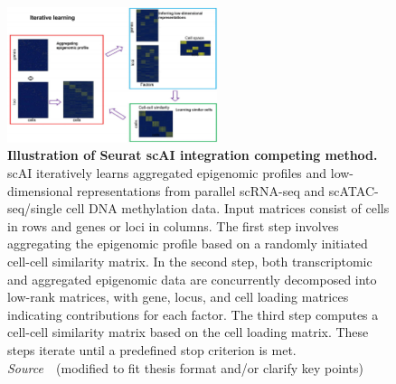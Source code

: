 \begin{description}


\begin{figure}[!h]
  	\centering
  	\includegraphics[width=0.55\textwidth]{Alg_scAI/fig}
  	\vspace{0.1cm}
  	\caption[Illustration of Seurat scAI integration competing method.]{\textbf{Illustration of Seurat scAI integration competing method.} scAI iteratively learns aggregated epigenomic profiles and low-dimensional representations from parallel scRNA-seq and scATAC-seq/single cell DNA methylation data. Input matrices consist of cells in rows and genes or loci in columns. The first step involves aggregating the epigenomic profile based on a randomly initiated cell-cell similarity matrix. In the second step, both transcriptomic and aggregated epigenomic data are concurrently decomposed into low-rank matrices, with gene, locus, and cell loading matrices indicating contributions for each factor. The third step computes a cell-cell similarity matrix based on the cell loading matrix. These steps iterate until a predefined stop criterion is met. \emph{Source~\cite{jin2020scai}}~(modified to fit thesis format and/or clarify key points)
  }
  	\label{fig:Alg_scAI}
\end{figure}


\end{description}
